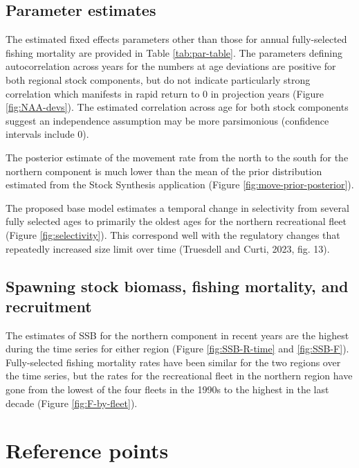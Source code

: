 \documentclass[
]{article}
\begin{document}
\hypertarget{parameter-estimates}{%
\subsection{Parameter estimates}\label{parameter-estimates}}

The estimated fixed effects parameters other than those for annual fully-selected fishing mortality are provided in Table \ref{tab:par-table}. The parameters defining autocorrelation across years for the numbers at age deviations are positive for both regional stock components, but do not indicate particularly strong correlation which manifests in rapid return to 0 in projection years (Figure \ref{fig:NAA-devs}). The estimated correlation across age for both stock components suggest an independence assumption may be more parsimonious (confidence intervals include 0).

The posterior estimate of the movement rate from the north to the south for the northern component is much lower than the mean of the prior distribution estimated from the Stock Synthesis application (Figure \ref{fig:move-prior-posterior}).

The proposed base model estimates a temporal change in selectivity from several fully selected ages to primarily the oldest ages for the northern recreational fleet (Figure \ref{fig:selectivity}). This correspond well with the regulatory changes that repeatedly increased size limit over time (Truesdell and Curti, 2023, fig. 13).

\hypertarget{spawning-stock-biomass-fishing-mortality-and-recruitment}{%
\subsection{Spawning stock biomass, fishing mortality, and recruitment}\label{spawning-stock-biomass-fishing-mortality-and-recruitment}}

The estimates of SSB for the northern component in recent years are the highest during the time series for either region (Figure \ref{fig:SSB-R-time} and \ref{fig:SSB-F}). Fully-selected fishing mortality rates have been similar for the two regions over the time series, but the rates for the recreational fleet in the northern region have gone from the lowest of the four fleets in the 1990s to the highest in the last decade (Figure \ref{fig:F-by-fleet}).

\hypertarget{reference-points}{%
\section{Reference points}\label{reference-points}}
\end{document}

